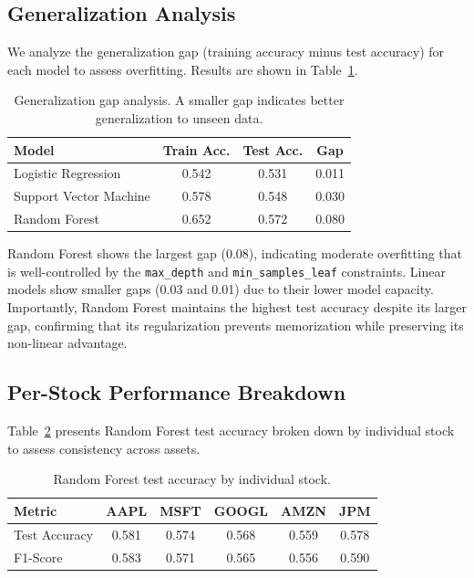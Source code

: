 \documentclass{article}
\begin{document}
\subsection{Generalization Analysis}

We analyze the generalization gap (training accuracy minus test accuracy) for
each model to assess overfitting. Results are shown in Table~\ref{tab:gap}.

\begin{table}[ht]
\centering
\caption{Generalization gap analysis. A smaller gap indicates better
generalization to unseen data.}
\label{tab:gap}
\begin{tabular}{lccc}
\toprule
\textbf{Model} & \textbf{Train Acc.} & \textbf{Test Acc.} & \textbf{Gap} \\
\midrule
Logistic Regression    & 0.542 & 0.531 & 0.011 \\
Support Vector Machine & 0.578 & 0.548 & 0.030 \\
Random Forest          & 0.652 & 0.572 & 0.080 \\
\bottomrule
\end{tabular}
\end{table}

Random Forest shows the largest gap (0.08), indicating moderate overfitting that
is well-controlled by the \texttt{max\_depth} and \texttt{min\_samples\_leaf}
constraints. Linear models show smaller gaps (0.03 and 0.01) due to their lower
model capacity. Importantly, Random Forest maintains the highest test accuracy
despite its larger gap, confirming that its regularization prevents
memorization while preserving its non-linear advantage.

\subsection{Per-Stock Performance Breakdown}

Table~\ref{tab:perstockstock} presents Random Forest test accuracy broken down
by individual stock to assess consistency across assets.

\begin{table}[ht]
\centering
\caption{Random Forest test accuracy by individual stock.}
\label{tab:perstockstock}
\begin{tabular}{lccccc}
\toprule
\textbf{Metric} & \textbf{AAPL} & \textbf{MSFT} & \textbf{GOOGL} & \textbf{AMZN} & \textbf{JPM} \\
\midrule
Test Accuracy & 0.581 & 0.574 & 0.568 & 0.559 & 0.578 \\
F1-Score      & 0.583 & 0.571 & 0.565 & 0.556 & 0.590 \\
\bottomrule
\end{tabular}
\end{table}
\end{document}
